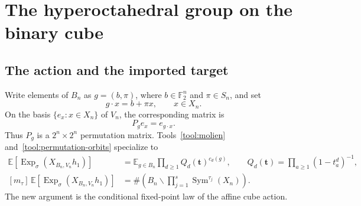 \documentclass[10pt]{article}
\newcommand{\Sym}{\operatorname{Sym}}
\newcommand{\Tr}{\operatorname{Tr}}
\newcommand{\Fix}{\operatorname{Fix}}
\newcommand{\ExpS}{\operatorname{Exp}_{\sigma}}
\newcommand{\smgv}[2]{\mathbb E\!\left[\ExpS\!\left(X_{#1,#2}h_1\right)\right]}
\newcommand{\F}{\mathbb F}
\newcommand{\C}{\mathbb C}
\newcommand{\E}{\mathbb E}
\begin{document}
\section{The hyperoctahedral group on the binary cube}\label{proof:hyperoctahedral-cube}
\begingroup
\providecommand{\F}{\mathbb F}
\renewcommand{\F}{\mathbb F}
\providecommand{\C}{\mathbb C}
\renewcommand{\C}{\mathbb C}
\providecommand{\E}{\mathbb E}
\renewcommand{\E}{\mathbb E}
\providecommand{\Prob}{\mathbb P}
\renewcommand{\Prob}{\mathbb P}
\providecommand{\Fix}{\operatorname{Fix}}
\renewcommand{\Fix}{\operatorname{Fix}}
\providecommand{\Tr}{\operatorname{Tr}}
\renewcommand{\Tr}{\operatorname{Tr}}
\providecommand{\Sym}{\operatorname{Sym}}
\renewcommand{\Sym}{\operatorname{Sym}}
\providecommand{\Exp}{\operatorname{Exp}}
\renewcommand{\Exp}{\operatorname{Exp}}
\providecommand{\stirling}[2]{\genfrac{[}{]}{0pt}{}{#1}{#2}}
\renewcommand{\stirling}[2]{\genfrac{[}{]}{0pt}{}{#1}{#2}}
\setcounter{theorem}{0}
\setcounter{proposition}{0}
\setcounter{lemma}{0}
\setcounter{corollary}{0}
\setcounter{remark}{0}
\begin{abstract}
Let $B_n=C_2^n\rtimes S_n$ act affinely on $X_n=\F_2^n$ and let
$V_n=\C[X_n]$.  We prove the proposed fixed-point distribution and moment
formulas, derive the exact signed-cycle-type expression for the full
$\sigma$-MGF, and describe an independent exhaustive verification.  The
program constructs every $2^n\times2^n$ permutation matrix, computes the
target directly, traverses the relevant monomial-basis orbits, and compares
both results with the signed-cycle formula for $1\leq n\leq5$.  All checks
pass; the largest case has $|B_5|=3840$ matrices of size $32\times32$.
\end{abstract}

\subsection{The action and the imported target}
Write elements of $B_n$ as $g=(b,\pi)$, where $b\in\F_2^n$ and
$\pi\in S_n$, and set
\[
g\cdot x=b+\pi x,\qquad x\in X_n.
\]
On the basis $\{e_x:x\in X_n\}$ of $V_n$, the corresponding matrix is
\begin{equation}\label{hyperoctahedral-cube-proof-and-verification:eq:matrix}
P_g e_x=e_{g\cdot x}.
\end{equation}
Thus $P_g$ is a $2^n\times2^n$ permutation matrix.  Tools~\ref{tool:molien}
and~\ref{tool:permutation-orbits} specialize to
\begin{align}
\smgv{B_n}{V_n}
&=\E_{g\in B_n}\prod_{d\geq1}Q_d(\mathbf t)^{c_d(g)},
\qquad Q_d(\mathbf t)=\prod_{a\geq1}(1-t_a^d)^{-1},
\label{hyperoctahedral-cube-proof-and-verification:eq:molien}\\
[m_\tau]\,\smgv{B_n}{V_n}
&=\#\left(B_n\backslash\prod_{j=1}^s\Sym^{\tau_j}(X_n)\right).
\label{hyperoctahedral-cube-proof-and-verification:eq:orbit-coeff}
\end{align}
The new argument is the conditional fixed-point law of the affine cube action.
\end{document}
